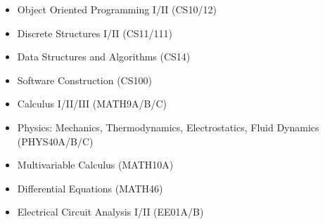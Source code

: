 \begin{cvcourses}
{\begin{multicols}{3}
\begin{itemize}
          \item Object Oriented Programming I/II (CS10/12) %
          \item Discrete Structures I/II (CS11/111) %
          \item Data Structures and Algorithms (CS14) %
          \item Software Construction (CS100) %
          \item Calculus I/II/III (MATH9A/B/C) %
          \item Physics: Mechanics, Thermodynamics, Electrostatics, Fluid Dynamics (PHYS40A/B/C) %
          \item Multivariable Calculus (MATH10A) %
          \item Differential Equations (MATH46) %
          \item Electrical Circuit Analysis I/II (EE01A/B) %

\end{itemize}
\end{multicols}}
\end{cvcourses}
